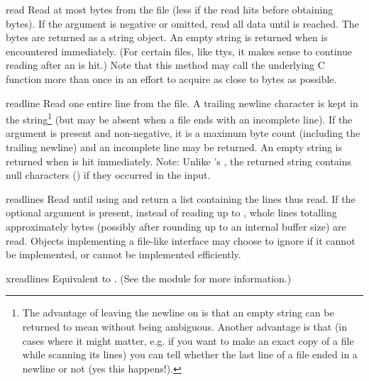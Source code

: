 \begin{methoddesc}[file]{read}{}
  Read at most  bytes from the file (less if the read hits
  \EOF{} before obtaining  bytes).  If the 
  argument is negative or omitted, read all data until \EOF{} is
  reached.  The bytes are returned as a string object.  An empty
  string is returned when \EOF{} is encountered immediately.  (For
  certain files, like ttys, it makes sense to continue reading after
  an \EOF{} is hit.)  Note that this method may call the underlying
  C function  more than once in an effort to
  acquire as close to  bytes as possible.
\end{methoddesc}

\begin{methoddesc}[file]{readline}{}
  Read one entire line from the file.  A trailing newline character is
  kept in the string\footnote{
	The advantage of leaving the newline on is that an empty string 
	can be returned to mean \EOF{} without being ambiguous.  Another 
	advantage is that (in cases where it might matter, e.g. if you 
	want to make an exact copy of a file while scanning its lines) 
	you can tell whether the last line of a file ended in a newline
	or not (yes this happens!).
  } (but may be absent when a file ends with an
  incomplete line).  If the  argument is present and
  non-negative, it is a maximum byte count (including the trailing
  newline) and an incomplete line may be returned.
  An empty string is returned when \EOF{} is hit
  immediately.  Note: Unlike 's , the
  returned string contains null characters () if they
  occurred in the input.
\end{methoddesc}

\begin{methoddesc}[file]{readlines}{}
  Read until \EOF{} using  and return a list containing
  the lines thus read.  If the optional  argument is
  present, instead of reading up to \EOF{}, whole lines totalling
  approximately  bytes (possibly after rounding up to an
  internal buffer size) are read.  Objects implementing a file-like
  interface may choose to ignore  if it cannot be
  implemented, or cannot be implemented efficiently.
\end{methoddesc}

\begin{methoddesc}[file]{xreadlines}{}
  Equivalent to
  .
  (See the  module for more information.)
\end{methoddesc}


